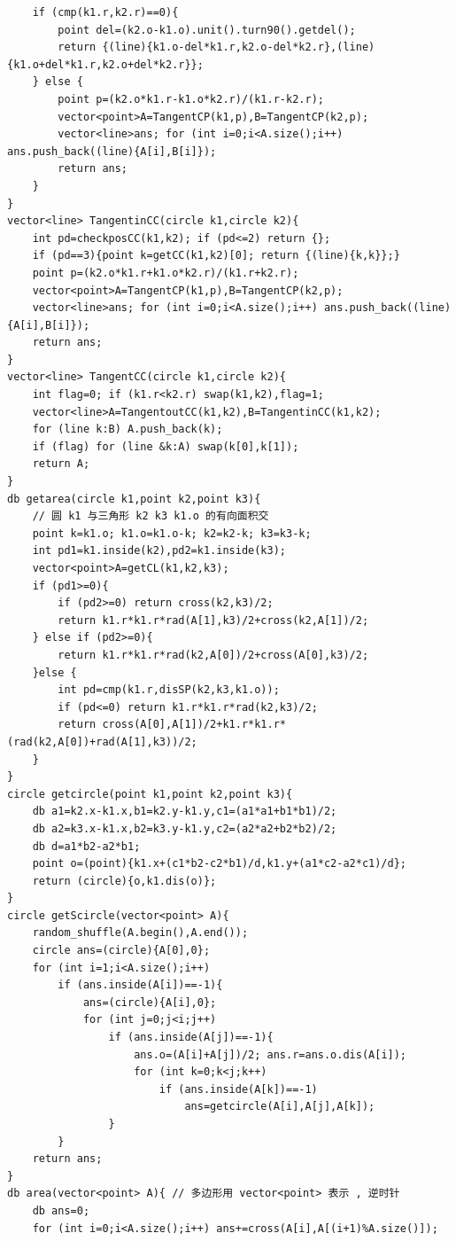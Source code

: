 \documentclass[twoside]{article}
\begin{document}
\begin{lstlisting}
    if (cmp(k1.r,k2.r)==0){
        point del=(k2.o-k1.o).unit().turn90().getdel();
        return {(line){k1.o-del*k1.r,k2.o-del*k2.r},(line){k1.o+del*k1.r,k2.o+del*k2.r}};
    } else {
        point p=(k2.o*k1.r-k1.o*k2.r)/(k1.r-k2.r);
        vector<point>A=TangentCP(k1,p),B=TangentCP(k2,p);
        vector<line>ans; for (int i=0;i<A.size();i++) ans.push_back((line){A[i],B[i]}); 
        return ans;
    }
}
vector<line> TangentinCC(circle k1,circle k2){
    int pd=checkposCC(k1,k2); if (pd<=2) return {};
    if (pd==3){point k=getCC(k1,k2)[0]; return {(line){k,k}};} 
    point p=(k2.o*k1.r+k1.o*k2.r)/(k1.r+k2.r);
    vector<point>A=TangentCP(k1,p),B=TangentCP(k2,p);
    vector<line>ans; for (int i=0;i<A.size();i++) ans.push_back((line){A[i],B[i]}); 
    return ans;
}
vector<line> TangentCC(circle k1,circle k2){
    int flag=0; if (k1.r<k2.r) swap(k1,k2),flag=1;
    vector<line>A=TangentoutCC(k1,k2),B=TangentinCC(k1,k2);
    for (line k:B) A.push_back(k); 
    if (flag) for (line &k:A) swap(k[0],k[1]);
    return A;
}
db getarea(circle k1,point k2,point k3){
    // 圆 k1 与三角形 k2 k3 k1.o 的有向面积交
    point k=k1.o; k1.o=k1.o-k; k2=k2-k; k3=k3-k;
    int pd1=k1.inside(k2),pd2=k1.inside(k3); 
    vector<point>A=getCL(k1,k2,k3);
    if (pd1>=0){
        if (pd2>=0) return cross(k2,k3)/2;
        return k1.r*k1.r*rad(A[1],k3)/2+cross(k2,A[1])/2;
    } else if (pd2>=0){ 
        return k1.r*k1.r*rad(k2,A[0])/2+cross(A[0],k3)/2;
    }else {
        int pd=cmp(k1.r,disSP(k2,k3,k1.o));
        if (pd<=0) return k1.r*k1.r*rad(k2,k3)/2;
        return cross(A[0],A[1])/2+k1.r*k1.r*(rad(k2,A[0])+rad(A[1],k3))/2;
    }
}
circle getcircle(point k1,point k2,point k3){
    db a1=k2.x-k1.x,b1=k2.y-k1.y,c1=(a1*a1+b1*b1)/2;
    db a2=k3.x-k1.x,b2=k3.y-k1.y,c2=(a2*a2+b2*b2)/2;
    db d=a1*b2-a2*b1;
    point o=(point){k1.x+(c1*b2-c2*b1)/d,k1.y+(a1*c2-a2*c1)/d};
    return (circle){o,k1.dis(o)};
}
circle getScircle(vector<point> A){
    random_shuffle(A.begin(),A.end());
    circle ans=(circle){A[0],0};
    for (int i=1;i<A.size();i++)
        if (ans.inside(A[i])==-1){
            ans=(circle){A[i],0};
            for (int j=0;j<i;j++)
                if (ans.inside(A[j])==-1){
                    ans.o=(A[i]+A[j])/2; ans.r=ans.o.dis(A[i]);
                    for (int k=0;k<j;k++)
                        if (ans.inside(A[k])==-1)
                            ans=getcircle(A[i],A[j],A[k]);
                }
        }
    return ans;
}
db area(vector<point> A){ // 多边形用 vector<point> 表示 , 逆时针 
    db ans=0;
    for (int i=0;i<A.size();i++) ans+=cross(A[i],A[(i+1)%A.size()]);

\end{lstlisting}
\end{document}

